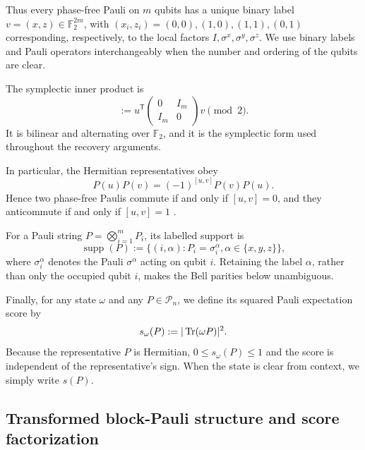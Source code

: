 \documentclass[
  aps,
  prx,
  reprint,
  superscriptaddress,
  amsmath,
  amssymb,
  nofootinbib,
  longbibliography
]{revtex4-2}
\newcommand{\supp}{\operatorname{supp}}
\newcommand{\Pc}{\mathcal{P}}
\newcommand{\Fc}{\mathbb{F}_2}
\begin{document}
Thus every phase-free Pauli on $m$ qubits has a unique binary label
$v=(x,z)\in\Fc^{2m}$, with $(x_i,z_i)=(0,0),(1,0),(1,1),(0,1)$ corresponding,
respectively, to the local factors $I,\sigma^x,\sigma^y,\sigma^z$.  We use
binary labels and Pauli operators interchangeably when the number and
ordering of the qubits are clear.

The symplectic inner product is
\begin{equation}
[u,v]
:=
u^\mathsf{T}
\begin{pmatrix}
0 & I_m \\
I_m & 0
\end{pmatrix}
v
\pmod 2.
\end{equation}
It is bilinear and alternating over $\Fc$, and it is the symplectic form used
throughout the recovery arguments.

In particular, the Hermitian representatives obey
\begin{equation}
P(u)P(v)=(-1)^{[u,v]}P(v)P(u).
\end{equation}
Hence two phase-free Paulis commute if and only if $[u,v]=0$, and they
anticommute if and only if $[u,v]=1$
\cite{Gottesman1997,DehaeneDeMoor2003,AaronsonGottesman2004}.

For a Pauli string $P=\bigotimes_{i=1}^m P_i$, its labelled support is
\begin{equation}
\supp(P)
:=
\bigl\{(i,\alpha):P_i=\sigma_i^\alpha,
\alpha\in\{x,y,z\}\bigr\},
\end{equation}
where $\sigma_i^\alpha$ denotes the Pauli $\sigma^\alpha$ acting on qubit
$i$.  Retaining the label $\alpha$, rather than only the occupied qubit $i$,
makes the Bell parities below unambiguous.

Finally, for any state $\omega$ and any $P\in\Pc_n$, we define its squared
Pauli expectation score by
\begin{equation}
s_\omega(P):=|\Tr(\omega P)|^2.
\label{eq:supp-score-def}
\end{equation}
Because the representative $P$ is Hermitian, $0\le s_\omega(P)\le1$ and the
score is independent of the representative's sign.  When the state is clear
from context, we simply write $s(P)$.

\subsection{Transformed block-Pauli structure and score factorization}
\label{sec:supp-block-factorization}
\end{document}
